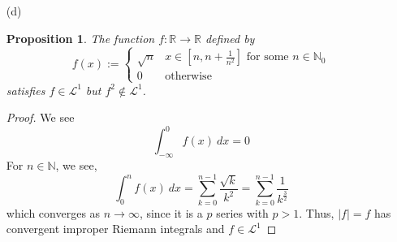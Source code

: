 \documentclass[12pt, reqno]{amsart}
\newtheorem{prop}{Proposition}[section]
\theoremstyle{definition}
\theoremstyle{remark}
\begin{document}
\begin{itemize}
\begin{itemize}
\begin{proof}
\begin{itemize}
\item[$\mathbb{R}AI-3$:] Since $\phi\in\mathcal{L}^{1}$, pick $R>0$ such that $$\int_{\mathbb{R}\setminus(-R,R)}\phi(x)\ dx<\epsilon$$
If $\epsilon<1$, we have 
\begin{align}
\int_{\mathbb{R}\setminus(-R,R)}\phi_{\epsilon}(x)\ dx&= \int_{-\infty}^{-R} \frac{1}{\epsilon}\phi\left( \frac{1}{\epsilon}x\right)dx+\int_{R}^{\infty} \frac{1}{\epsilon}\phi\left( \frac{1}{\epsilon}x\right)\ dx\\
&= \int_{-\infty}^{- \frac{R}{\epsilon}}\phi(t)\ dt+\int_{\frac{R}{\epsilon}}^{\infty}\phi(t)\ dt\quad(\text{change variables }t= \frac{x}{\epsilon})\\
&\le \int_{-\infty}^{R}\phi(t)\ dt+\int_{R}^{\infty}\phi(t)\ dt \label{c}
\\
&= \int_{\mathbb{R}\setminus(-R,R)}\phi(t)\ dt\\
&< \epsilon
\end{align}
where the monotonicity of the integrals in (\ref{c}) holds for the non-negative real-valued function $\phi$.

\end{itemize}
\end{proof}

\vspace{0.1 cm}
\item[(d)] %

\begin{prop}
    The function $f:\mathbb{R}\to\mathbb{R}$ defined by
    \begin{equation} \label{f}
        f(x):=\begin{cases}
         \sqrt{n} & x\in \left[n,n+ \frac{1}{n^ 2}\right]\text{ for some }n\in \mathbb{N}_{0} \\
        0 & \text{otherwise}
        \end{cases}
    \end{equation}
    satisfies $f\in\mathcal{L}^1$ but $f^2\notin\mathcal{L}^1$.
\end{prop}

\begin{proof}
    We see $$\int_{-\infty}^{0}f(x)\ dx=0$$
For $n\in \mathbb{N}$, we see, $$\int_{0}^{n}f(x)\ dx= \sum_{k=0}^{n-1} \frac{\sqrt{k}}{k^{2}}=\sum_{k=0}^{n-1} \frac{1}{k^{\frac{3}{2}}}$$which converges as $n \rightarrow \infty$, since it is a $p$ series with $p>1$. Thus, $|f|=f$ has convergent improper Riemann integrals and $f\in\mathcal{L}^{1}$


\end{proof}
\end{itemize}
\end{itemize}
\end{document}
